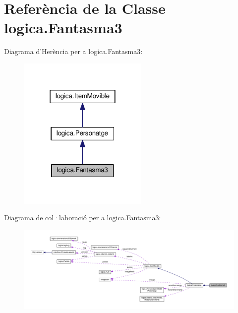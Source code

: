 \hypertarget{classlogica_1_1_fantasma3}{\section{Referència de la Classe logica.\+Fantasma3}
\label{classlogica_1_1_fantasma3}
}


Diagrama d'Herència per a logica.\+Fantasma3\+:\nopagebreak
\begin{figure}[H]
\begin{center}
\leavevmode
\includegraphics[width=178pt]{classlogica_1_1_fantasma3__inherit__graph}
\end{center}
\end{figure}


Diagrama de col·laboració per a logica.\+Fantasma3\+:\nopagebreak
\begin{figure}[H]
\begin{center}
\leavevmode
\includegraphics[width=350pt]{classlogica_1_1_fantasma3__coll__graph}
\end{center}
\end{figure}
